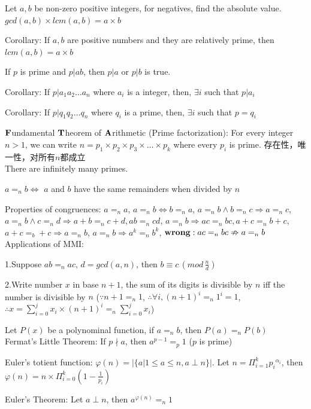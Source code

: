 \documentclass[12pt,a4paper]{ctexrep}
\begin{document}
Let $a,b$ be non-zero positive integers, for negatives, find the absolute value. $gcd(a,b) \times lcm(a,b) = a\times b$

Corollary:
If $a,b$ are positive numbers and they are relatively prime, then $lcm(a,b) = a \times b$

If $p$ is prime and $p|ab$, then $p|a$ or $p|b$ is true.

Corollary:
If $p|a_1a_2\dots a_n$ where $a_i$ is a integer, then, $\exists i$ such that $p|a_i$

Corollary:
If $p|q_1q_2\dots q_n$ where $q_i$ is a prime, then, $\exists i$ such that $p = q_i$

$\bold{F}$undamental $\bold{T}$heorem of $\bold{A}$rithmetic (Prime factorization):
For every integer $n>1$, we can write $n = p_1\times p_2 \times p_3 \times \dots \times p_k$ where every $p_i$ is prime. 存在性，唯一性，对所有$n$都成立\\

There are infinitely many primes.

$a=_nb \iff$ $a$ and $b$ have the same remainders when divided by $n$

Properties of congruences:
$a=_na$, $a=_nb \Leftrightarrow b=_na$, $a=_nb \wedge b=_nc \Rightarrow a=_nc$, $a=_nb \wedge c=_nd \Rightarrow a+b=_nc+d , ab=_ncd$, $a=_nb \Rightarrow ac=_nbc, a+c =_n b+c$, $a+c=_b+c \Rightarrow a=_nb$, $a=_nb \Rightarrow a^k=_nb^k$, $\bold{wrong:}\; ac=_nbc \nRightarrow a=_nb$\\

Applications of MMI:

1.Suppose $ab =_n ac, \, d=gcd(a,n)$, then $ b\equiv c\,(mod\,\frac{n}{d})$

2.Write number $x$ in base $n+1$, the sum of its digits is divisible by $n$ iff the number is divisible by $n$ ($\because n+1 =_n 1$, $\therefore \forall i, (n+1)^i =_n 1^i = 1$, $\therefore x=\sum_{i=0}^j x_i\times(n+1)^i =_n \sum_{i=0}^j x_i$)

Let $P(x)$ be a polynominal function, if $a =_n b$, then $P(a) =_n P(b)$\\

Fermat's Little Theorem:
If $p\nmid a$, then $a^{p-1} =_p 1$ ($p$ is prime)

Euler's totient function:
$\varphi(n) = |\{a|1\leqslant a \leqslant n, a\perp n\}|$. Let $n=\Pi_{i=1}^k {p_i}^{\alpha_i}$, then $\varphi(n) = n\times \Pi_{i=0}^k (1-\frac{1}{p_i})$

Euler's Theorem:
Let $a \perp n$, then $a^{\varphi(n)} =_n 1$
\end{document}
